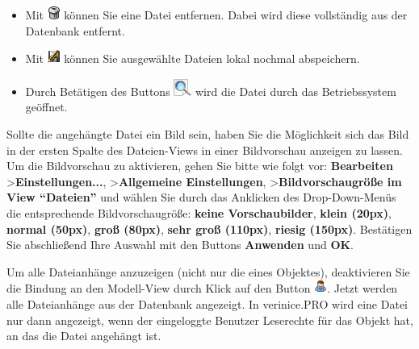 \documentclass[a4paper,10pt]{book}
\begin{document}
\begin{itemize}
 \item Mit \includegraphics[height=2ex]{Icon/Delete.png} können Sie eine Datei entfernen. Dabei wird diese vollständig aus der Datenbank entfernt.
 \item Mit \includegraphics[height=2ex]{Icon/Save.png} können Sie ausgewählte Dateien lokal nochmal abspeichern.
 \item Durch Betätigen des Buttons \includegraphics[height=2ex]{Icon/Suchen.png} wird die Datei durch das Betriebssystem geöffnet.
\end{itemize}
Sollte die angehängte Datei ein Bild sein, haben Sie die Möglichkeit sich das Bild in der ersten Spalte des Dateien-Views in einer Bildvorschau anzeigen zu lassen. Um die Bildvorschau zu aktivieren, gehen Sie bitte wie folgt vor: \textbf{Bearbeiten} \textgreater \textbf{Einstellungen...},
\textgreater \textbf{Allgemeine Einstellungen}, \textgreater \textbf{Bildvorschaugröße im View ``Dateien''} und wählen Sie durch das Anklicken des Drop-Down-Menüs
die entsprechende Bildvorschaugröße: \textbf{keine Vorschaubilder}, \textbf{klein (20px)}, \textbf{normal (50px)}, \textbf{groß (80px)}, \textbf{sehr groß (110px)},
\textbf{riesig (150px)}. Bestätigen Sie abschließend Ihre Auswahl mit den Buttons \textbf{Anwenden} und \textbf{OK}.

Um alle Dateianhänge anzuzeigen (nicht nur die eines Objektes), deaktivieren Sie die Bindung an den Modell-View durch Klick auf den Button \includegraphics[height=2ex]{Icon/Mitarbeiter.png}. Jetzt werden alle Dateianhänge aus der Datenbank angezeigt. In verinice.PRO wird eine Datei nur dann angezeigt, wenn der eingeloggte Benutzer Leserechte für das Objekt hat, an das die Datei angehängt ist.
\end{document}
